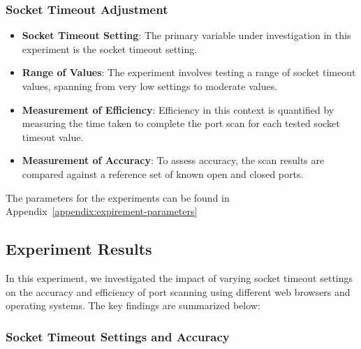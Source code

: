 \subsubsection{Socket Timeout Adjustment}

\begin{itemize}
  \item \textbf{Socket Timeout Setting}: The primary variable under investigation in this experiment is the socket timeout setting.
  
  \item \textbf{Range of Values}: The experiment involves testing a range of socket timeout values, spanning from very low settings to moderate values.
  
  \item \textbf{Measurement of Efficiency}: Efficiency in this context is quantified by measuring the time taken to complete the port scan for each tested socket timeout value.
  
  \item \textbf{Measurement of Accuracy}: To assess accuracy, the scan results are compared against a reference set of known open and closed ports.
\end{itemize}

The parameters for the experiments can be found in Appendix~\ref{appendix:expirement-parameters}




\subsection{Experiment Results}

In this experiment, we investigated the impact of varying socket timeout settings on the accuracy and efficiency of port scanning using different web browsers and operating systems. The key findings are summarized below:

\subsubsection{Socket Timeout Settings and Accuracy}

